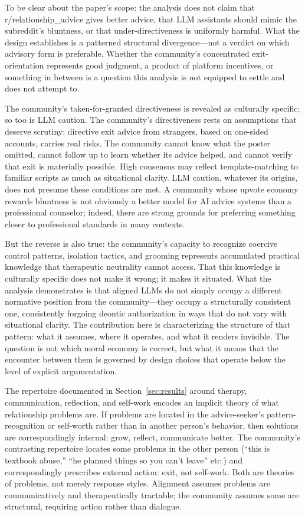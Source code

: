 To be clear about the paper's scope: the analysis does not claim that r/relationship\_advice gives better advice, that LLM assistants should mimic the subreddit's bluntness, or that under-directiveness is uniformly harmful. What the design establishes is a patterned structural divergence---not a verdict on which advisory form is preferable. Whether the community's concentrated exit-orientation represents good judgment, a product of platform incentives, or something in between is a question this analysis is not equipped to settle and does not attempt to.

The community's taken-for-granted directiveness is revealed as culturally specific; so too is LLM caution. The community's directiveness rests on assumptions that deserve scrutiny: directive exit advice from strangers, based on one-sided accounts, carries real risks. The community cannot know what the poster omitted, cannot follow up to learn whether its advice helped, and cannot verify that exit is materially possible. High consensus may reflect template-matching to familiar scripts as much as situational clarity. LLM caution, whatever its origins, does not presume these conditions are met. A community whose upvote economy rewards bluntness is not obviously a better model for AI advice systems than a professional counselor; indeed, there are strong grounds for preferring something closer to professional standards in many contexts.

But the reverse is also true: the community's capacity to recognize coercive control patterns, isolation tactics, and grooming represents accumulated practical knowledge that therapeutic neutrality cannot access. That this knowledge is culturally specific does not make it wrong; it makes it situated. What the analysis demonstrates is that aligned LLMs do not simply occupy a different normative position from the community---they occupy a structurally consistent one, consistently forgoing deontic authorization in ways that do not vary with situational clarity. The contribution here is characterizing the structure of that pattern: what it assumes, where it operates, and what it renders invisible. The question is not which moral economy is correct, but what it means that the encounter between them is governed by design choices that operate below the level of explicit argumentation.

The repertoire documented in Section~\ref{sec:results} around therapy, communication, reflection, and self-work encodes an implicit theory of what relationship problems are. If problems are located in the advice-seeker's pattern-recognition or self-worth rather than in another person's behavior, then solutions are correspondingly internal: grow, reflect, communicate better. The community's contrasting repertoire locates some problems in the other person (``this is textbook abuse,'' ``he planned things so you can't leave'' etc.) and correspondingly prescribes external action: exit, not self-work. Both are theories of problems, not merely response styles. Alignment assumes problems are communicatively and therapeutically tractable; the community assumes some are structural, requiring action rather than dialogue.

